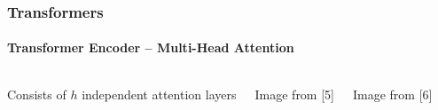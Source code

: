 \documentclass[xetex,professionalfont]{beamer}
\begin{document}
\begin{frame}
	\frametitle{Transformers}
	\framesubtitle{Transformer Encoder -- Multi-Head Attention}

	\begin{columns}

		Consists of $h$ independent attention layers

		\smallskip

		\begin{center}
			{\centering Image from [5]}
		\end{center}


		\begin{center}
			{\centering Image from [6]}
		\end{center}

	\end{columns}

\end{frame}
\end{document}
